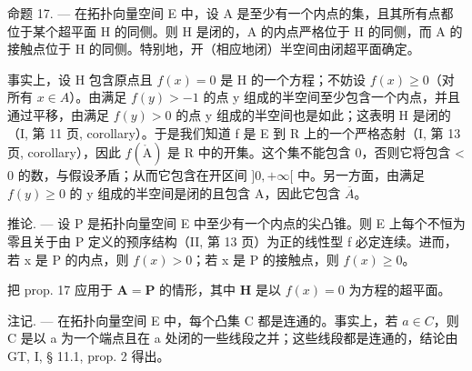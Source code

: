 命题 17. --- 在拓扑向量空间 E 中，设 A 是至少有一个内点的集，且其所有点都位于某个超平面 H 的同侧。则 H 是闭的，A 的内点严格位于 H 的同侧，而 A 的接触点位于 H 的同侧。特别地，开（相应地闭）半空间由闭超平面确定。

事实上，设 H 包含原点且 \(f(x) = 0\) 是 H 的一个方程；不妨设 \(f(x) \geqslant 0\)（对所有 \(x \in A\)）。由满足 \(f(y) > -1\) 的点 y 组成的半空间至少包含一个内点，并且通过平移，由满足 \(f(y) > 0\) 的点 y 组成的半空间也是如此；这表明 H 是闭的（I, 第 11 页, corollary）。于是我们知道 f 是 E 到 R 上的一个严格态射（I, 第 13 页, corollary），因此 \(f(\mathring{\mathrm{A}})\) 是 R 中的开集。这个集不能包含 0，否则它将包含 \textless{} 0 的数，与假设矛盾；从而它包含在开区间 \(\bigg]0, +\infty[\) 中。另一方面，由满足 \(f(y) \geqslant 0\) 的 y 组成的半空间是闭的且包含 A，因此它包含 \(\overline{A}\)。

推论. --- 设 P 是拓扑向量空间 E 中至少有一个内点的尖凸锥。则 E 上每个不恒为零且关于由 P 定义的预序结构（II, 第 13 页）为正的线性型 f 必定连续。进而，若 x 是 P 的内点，则 \(f(x) > 0\)；若 x 是 P 的接触点，则 \(f(x) \geqslant 0\)。

把 prop. 17 应用于 \(\mathbf{A} = \mathbf{P}\) 的情形，其中 \(\mathbf{H}\) 是以 \(f(x) = 0\) 为方程的超平面。

注记. --- 在拓扑向量空间 E 中，每个凸集 C 都是连通的。事实上，若 \(a \in C\)，则 C 是以 a 为一个端点且在 a 处闭的一些线段之并；这些线段都是连通的，结论由 GT, I, § 11.1, prop. 2 得出。

